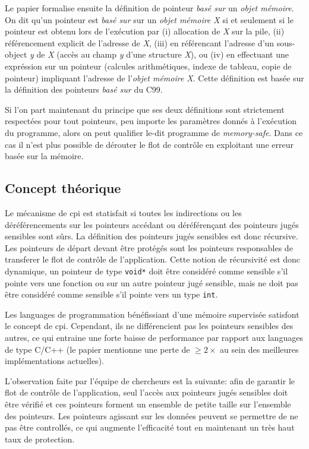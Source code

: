 Le papier formalise ensuite la définition de pointeur \textit{basé sur} un \textit{objet mémoire}. On dit qu'un pointeur est \textit{basé sur} sur un \textit{objet mémoire X} si et seulement si le pointeur est obtenu lors de l'exécution par (i) allocation de \textit{X} sur la pile, (ii) référencement explicit de l'adresse de \textit{X}, (iii) en référencant l'adresse d'un sous-object \textit{y} de \textit{X} (accès au champ \textit{y} d'une structure \textit{X}), ou (iv) en effectuant une expréssion sur un pointeur (calcules arithmétiques, indexe de tableau, copie de pointeur) impliquant l'adresse de l'\textit{objet mémoire X}. Cette définition est basée sur la définition des pointeurs \textit{basé sur} du C99.

\newpage

Si l'on part maintenant du principe que ses deux définitions sont strictement respectées pour tout pointeurs, peu importe les paramètres donnés à l'exécution du programme, alors on peut qualifier le-dit programme de \textit{memory-safe}. Dans ce cas il n'est plus possible de dérouter le flot de contrôle en exploitant une erreur basée sur la mémoire.

\subsection{Concept théorique}

Le mécanisme de \gls{cpi} est statisfait si toutes les indirections ou les déréférencements sur les pointeurs accédant ou déréférençant des pointeurs jugés \og sensibles \fg sont sûrs. La définition des pointeurs jugés sensibles est donc récursive. Les pointeurs de départ devant être protégés sont les pointeurs responsables de transferer le flot de contrôle de l'application. Cette notion de récursivité est donc dynamique, un pointeur de type \texttt{void*} doit être considéré comme sensible s'il pointe vers une fonction ou sur un autre pointeur jugé sensible, mais ne doit pas être considéré comme sensible s'il pointe vers un type \texttt{int}.

Les languages de programmation bénéfissiant d'une mémoire supervisée satisfont le concept de \gls{cpi}. Cependant, ils ne différencient pas les pointeurs sensibles des autres, ce qui entraine une forte baisse de performance par rapport aux languages de type C/C++ (le papier mentionne une perte de $\geq2\times$ au sein des meilleures implémentations actuelles).

L'observation faite par l'équipe de chercheurs est la suivante: afin de garantir le flot de contrôle de l'application, seul l'accès aux pointeurs jugés sensibles doit être vérifié et ces pointeurs forment un ensemble de petite taille sur l'ensemble des pointeurs. Les pointeurs agissant sur les données peuvent se permettre de ne pas être controllés, ce qui augmente l'efficacité tout en maintenant un très haut taux de protection.

